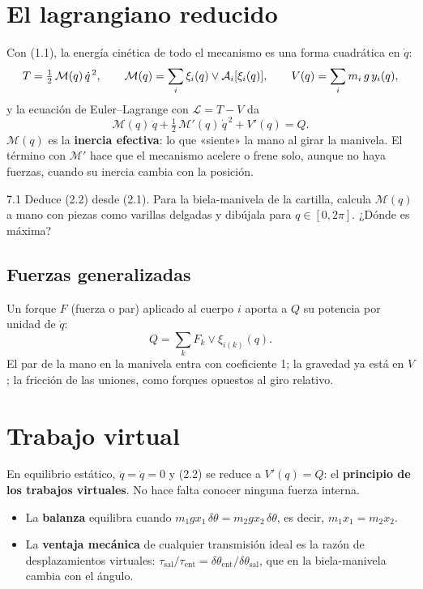\documentclass[11pt,a4paper]{article}
\begin{document}
\section{El lagrangiano reducido}

Con (1.1), la energía cinética de todo el mecanismo es una forma cuadrática en $\dot q$:
\begin{equation}
  T = \tfrac12\,\mathcal M(q)\,\dot q^{\,2},\qquad \mathcal M(q) = \sum_i \xi_i(q)\vee\mathcal{A}_i[\xi_i(q)],\qquad
  V(q) = \sum_i m_i\,g\,y_i(q),
\end{equation}
y la ecuación de Euler–Lagrange con $\mathcal L = T - V$ da
\begin{equation}
  \mathcal M(q)\,\ddot q + \tfrac12\,\mathcal M'(q)\,\dot q^{\,2} + V'(q) = Q .
\end{equation}
$\mathcal M(q)$ es la \textbf{inercia efectiva}: lo que «siente» la mano al girar la manivela. El término con
$\mathcal M'$ hace que el mecanismo acelere o frene solo, aunque no haya fuerzas, cuando su inercia cambia con la
posición.

\begin{ejercicio}{7.1}
Deduce (2.2) desde (2.1). Para la biela-manivela de la cartilla, calcula $\mathcal M(q)$ a mano con piezas como
varillas delgadas y dibújala para $q\in[0, 2\pi]$. ¿Dónde es máxima?
\end{ejercicio}

\subsection{Fuerzas generalizadas}
Un forque $F$ (fuerza o par) aplicado al cuerpo $i$ aporta a $Q$ su potencia por unidad de $\dot q$:
\begin{equation}
  Q = \sum_k F_k\vee\xi_{i(k)}(q).
\end{equation}
El par de la mano en la manivela entra con coeficiente 1; la gravedad ya está en $V$; la fricción de las uniones,
como forques opuestos al giro relativo.

\section{Trabajo virtual}

En equilibrio estático, $\ddot q = \dot q = 0$ y (2.2) se reduce a $V'(q) = Q$: el \textbf{principio de los trabajos
virtuales}. No hace falta conocer ninguna fuerza interna.
\begin{itemize}[leftmargin=*]
  \item La \textbf{balanza} equilibra cuando $m_1gx_1\,\delta\theta = m_2gx_2\,\delta\theta$, es decir, $m_1x_1 = m_2x_2$.
  \item La \textbf{ventaja mecánica} de cualquier transmisión ideal es la razón de desplazamientos virtuales:
        $\tau_{\text{sal}}/\tau_{\text{ent}} = \delta\theta_{\text{ent}}/\delta\theta_{\text{sal}}$, que en la
        biela-manivela cambia con el ángulo.
\end{itemize}
\end{document}
